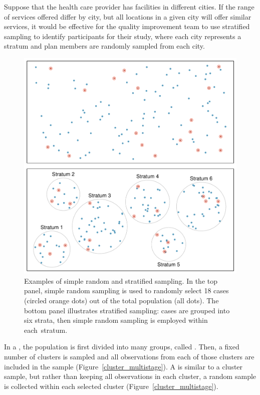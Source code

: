 Suppose that the health care provider has facilities in different cities. If the range of services offered differ by city, but all locations in a given city will offer similar services, it would be effective for the quality improvement team to use stratified sampling to identify participants for their study, where each city represents a stratum and plan members are randomly sampled from each city.

\begin{figure}
	\centering
	\includegraphics[width=\textwidth]{ch_01a_intro_to_data_oi_biostat/figures/samplingMethodsFigure/simple_stratified}
	\caption{Examples of simple random and stratified sampling. In the top panel, simple random sampling is used to randomly select 18 cases (circled orange dots) out of the total population (all dots). The bottom panel illustrates stratified sampling: cases are grouped into six strata, then simple random sampling is employed within \mbox{each stratum}.}
	\label{simple_stratified}
\end{figure}


In a , the population is first divided into many groups, called . Then, a fixed number of clusters is sampled and all observations from each of those clusters are included in the sample (Figure~\ref{cluster_multistage}). A  is similar to a cluster sample, but rather than keeping all observations in each cluster, a random sample is collected within each selected cluster (Figure~\ref{cluster_multistage}).

